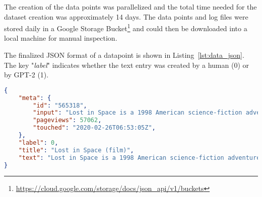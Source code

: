 The creation of the data points was parallelized and the total time needed for the dataset creation was approximately 14 days. The data points and log files were stored daily in a Google Storage Bucket\footnote{\url{https://cloud.google.com/storage/docs/json_api/v1/buckets}} and could then be downloaded into a local machine for manual inspection.

The finalized JSON format of a datapoint is shown in Listing~\ref{lst:data_json}. The key "\textit{label}" indicates whether the text entry was created by a human (0) or by GPT-2 (1).\\

\begin{lstlisting}[language=json,firstnumber=1,label={lst:data_json},caption={Example of a data point}]
{
	"meta": {
		"id": "565318",
		"input": "Lost in Space is a 1998 American science-fiction adventure",
		"pageviews": 57062,
		"touched": "2020-02-26T06:53:05Z",
	},
	"label": 0,
	"title": "Lost in Space (film)",
	"text": "Lost in Space is a 1998 American science-fiction adventure film directed by Stephen Hopkins, and starring William Hurt, Matt LeBlanc, and Gary Oldman. The plot is adapted from the 1965-1968 CBS television series \"of the same name\". Seve"
}
\end{lstlisting}